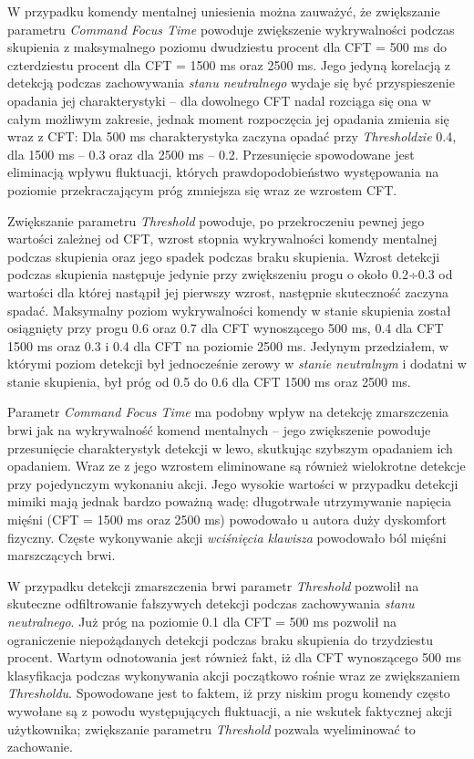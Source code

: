 \documentclass[skorowidz,skroty]{dyplomWEZUT}
\begin{document}
W przypadku komendy mentalnej uniesienia można zauważyć, że zwiększanie parametru \textit{Command Focus Time} powoduje zwiększenie wykrywalności podczas skupienia z maksymalnego poziomu dwudziestu procent dla CFT = 500 ms do czterdziestu procent dla CFT = 1500 ms oraz 2500 ms. Jego jedyną korelacją z detekcją podczas zachowywania \textit{stanu neutralnego} wydaje się być przyspieszenie opadania jej charakterystyki -- dla dowolnego CFT nadal rozciąga się ona w całym możliwym zakresie, jednak moment rozpoczęcia jej opadania zmienia się wraz z CFT: Dla 500 ms charakterystyka zaczyna opadać przy \textit{Thresholdzie} 0.4, dla 1500 ms -- 0.3 oraz dla 2500 ms -- 0.2. Przesunięcie spowodowane jest eliminacją wpływu fluktuacji, których prawdopodobieństwo występowania na poziomie przekraczającym próg zmniejsza się wraz ze wzrostem CFT.

Zwiększanie parametru \textit{Threshold} powoduje, po przekroczeniu pewnej jego wartości zależnej od CFT, wzrost stopnia wykrywalności komendy mentalnej podczas skupienia oraz jego spadek podczas braku skupienia. Wzrost detekcji podczas skupienia następuje jedynie przy zwiększeniu progu o około 0.2÷0.3 od wartości dla której nastąpił jej pierwszy wzrost, następnie skuteczność zaczyna spadać. Maksymalny poziom wykrywalności komendy w stanie skupienia został osiągnięty przy progu 0.6 oraz 0.7 dla CFT wynoszącego 500 ms, 0.4 dla CFT 1500 ms oraz 0.3 i 0.4 dla CFT na poziomie 2500 ms. Jedynym przedziałem, w którymi poziom detekcji był jednocześnie zerowy w \textit{stanie neutralnym} i dodatni w stanie skupienia, był próg od 0.5 do 0.6 dla CFT 1500 ms oraz 2500 ms.

Parametr \textit{Command Focus Time} ma podobny wpływ na detekcję zmarszczenia brwi jak na wykrywalność komend mentalnych -- jego zwiększenie powoduje przesunięcie charakterystyk detekcji w lewo, skutkując szybszym opadaniem ich opadaniem. Wraz ze z jego wzrostem eliminowane są również wielokrotne detekcje przy pojedynczym wykonaniu akcji. Jego wysokie wartości w przypadku detekcji mimiki mają jednak bardzo poważną wadę: długotrwałe utrzymywanie napięcia mięśni (CFT = 1500 ms oraz 2500 ms) powodowało u autora duży dyskomfort fizyczny. Częste wykonywanie akcji \textit{wciśnięcia klawisza} powodowało ból mięśni marszczących brwi.

W przypadku detekcji zmarszczenia brwi parametr \textit{Threshold} pozwolił na skuteczne odfiltrowanie fałszywych detekcji podczas zachowywania \textit{stanu neutralnego}. Już próg na poziomie 0.1 dla CFT = 500 ms pozwolił na ograniczenie niepożądanych detekcji podczas braku skupienia do trzydziestu procent. Wartym odnotowania jest również fakt, iż dla CFT wynoszącego 500 ms klasyfikacja podczas wykonywania akcji początkowo rośnie wraz ze zwiększaniem \textit{Thresholdu}. Spowodowane jest to faktem, iż przy niskim progu komendy często wywołane są z powodu występujących fluktuacji, a nie wskutek faktycznej akcji użytkownika; zwiększanie parametru \textit{Threshold} pozwala wyeliminować to zachowanie.
\end{document}
